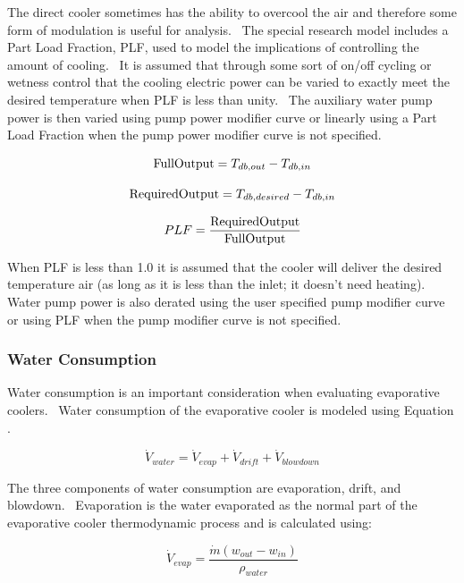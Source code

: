 The direct cooler sometimes has the ability to overcool the air and therefore some form of modulation is useful for analysis.~ The special research model includes a Part Load Fraction, PLF, used to model the implications of controlling the amount of cooling.~ It is assumed that through some sort of on/off cycling or wetness control that the cooling electric power can be varied to exactly meet the desired temperature when PLF is less than unity.~ The auxiliary water pump power is then varied using pump power modifier curve or linearly using a Part Load Fraction when the pump power modifier curve is not specified.

\begin{equation}
{\rm{FullOutput}} = {T_{db,out}} - {T_{db,in}}
\end{equation}

\begin{equation}
{\rm{RequiredOutput}} = {T_{db,desired}} - {T_{db,in}}
\end{equation}

\begin{equation}
PLF = \frac{{{\rm{RequiredOutput}}}}{{{\rm{FullOutput}}}}
\end{equation}

When PLF is less than 1.0 it is assumed that the cooler will deliver the desired temperature air (as long as it is less than the inlet; it doesn't need heating).~ Water pump power is also derated using the user specified pump modifier curve or using PLF when the pump modifier curve is not specified.

\subsubsection{Water Consumption}\label{water-consumption-1}

Water consumption is an important consideration when evaluating evaporative coolers.~ Water consumption of the evaporative cooler is modeled using Equation .

\begin{equation}
{\dot V_{water}} = {\dot V_{evap}} + {\dot V_{drift}} + {\dot V_{blowdown}}
\end{equation}

The three components of water consumption are evaporation, drift, and blowdown.~ Evaporation is the water evaporated as the normal part of the evaporative cooler thermodynamic process and is calculated using:

\begin{equation}
{\dot V_{evap}} = \frac{{\dot m\left( {{w_{out}} - {w_{in}}} \right)}}{{{\rho_{water}}}}
\end{equation}

